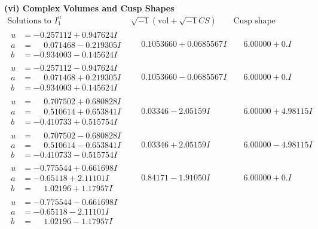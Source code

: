 \documentclass[1p]{elsarticle_modified}
\theoremstyle{definition}
\newcommand{\I}{\sqrt{-1}}
\begin{document}
\newpage\flushleft \textbf{(vi) Complex Volumes and Cusp Shapes}
$$\begin{array}{c|c|c}  
\text{Solutions to }I^u_{1}& \I (\text{vol} + \sqrt{-1}CS) & \text{Cusp shape}\\
 \hline 
\begin{aligned}
u &= -0.257112 + 0.947624 I \\
a &= \phantom{-}0.071468 - 0.219305 I \\
b &= -0.934003 - 0.145624 I\end{aligned}
 & \phantom{-}0.1053660 + 0.0685567 I & \phantom{-}6.00000 + 0. I\phantom{ +0.000000I} \\ \hline\begin{aligned}
u &= -0.257112 - 0.947624 I \\
a &= \phantom{-}0.071468 + 0.219305 I \\
b &= -0.934003 + 0.145624 I\end{aligned}
 & \phantom{-}0.1053660 - 0.0685567 I & \phantom{-}6.00000 + 0. I\phantom{ +0.000000I} \\ \hline\begin{aligned}
u &= \phantom{-}0.707502 + 0.680828 I \\
a &= \phantom{-}0.510614 + 0.653841 I \\
b &= -0.410733 + 0.515754 I\end{aligned}
 & \phantom{-}0.03346 - 2.05159 I & \phantom{-}6.00000 + 4.98115 I \\ \hline\begin{aligned}
u &= \phantom{-}0.707502 - 0.680828 I \\
a &= \phantom{-}0.510614 - 0.653841 I \\
b &= -0.410733 - 0.515754 I\end{aligned}
 & \phantom{-}0.03346 + 2.05159 I & \phantom{-}6.00000 - 4.98115 I \\ \hline\begin{aligned}
u &= -0.775544 + 0.661698 I \\
a &= -0.65118 + 2.11101 I \\
b &= \phantom{-}1.02196 + 1.17957 I\end{aligned}
 & \phantom{-}0.84171 - 1.91050 I & \phantom{-}6.00000 + 0. I\phantom{ +0.000000I} \\ \hline\begin{aligned}
u &= -0.775544 - 0.661698 I \\
a &= -0.65118 - 2.11101 I \\
b &= \phantom{-}1.02196 - 1.17957 I\end{aligned}

\end{array}$$
\end{document}
